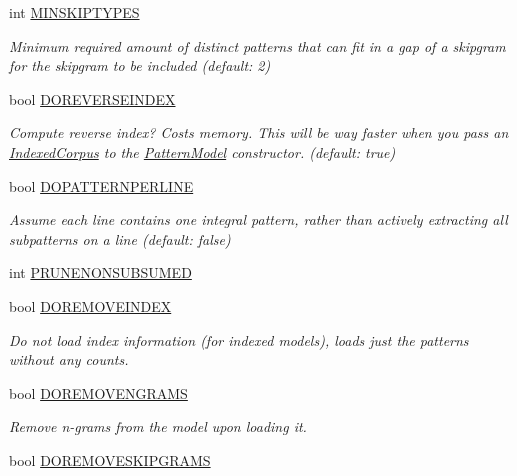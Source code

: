 \begin{DoxyCompactItemize}
int \hyperlink{classPatternModelOptions_ad5b2686b6f641463c54441a595259046}{M\+I\+N\+S\+K\+I\+P\+T\+Y\+P\+E\+S}
\begin{DoxyCompactList}\small\item\em Minimum required amount of distinct patterns that can fit in a gap of a skipgram for the skipgram to be included (default\+: 2) \end{DoxyCompactList}\item 
bool \hyperlink{classPatternModelOptions_ad4d4b2fa96e3355b9e3f4b8e51bb62ff}{D\+O\+R\+E\+V\+E\+R\+S\+E\+I\+N\+D\+E\+X}
\begin{DoxyCompactList}\small\item\em Compute reverse index? Costs memory. This will be way faster when you pass an \hyperlink{classIndexedCorpus}{Indexed\+Corpus} to the \hyperlink{classPatternModel}{Pattern\+Model} constructor. (default\+: true) \end{DoxyCompactList}\item 
bool \hyperlink{classPatternModelOptions_ad4391604983decec050de83f13cd6235}{D\+O\+P\+A\+T\+T\+E\+R\+N\+P\+E\+R\+L\+I\+N\+E}
\begin{DoxyCompactList}\small\item\em Assume each line contains one integral pattern, rather than actively extracting all subpatterns on a line (default\+: false) \end{DoxyCompactList}\item 
int \hyperlink{classPatternModelOptions_acb220b576d5b4126289cd4a6dec98a1c}{P\+R\+U\+N\+E\+N\+O\+N\+S\+U\+B\+S\+U\+M\+E\+D}
\item 
bool \hyperlink{classPatternModelOptions_ad7c8615dee16492c719bf455bb67e6a5}{D\+O\+R\+E\+M\+O\+V\+E\+I\+N\+D\+E\+X}
\begin{DoxyCompactList}\small\item\em Do not load index information (for indexed models), loads just the patterns without any counts. \end{DoxyCompactList}\item 
bool \hyperlink{classPatternModelOptions_a4ded839cdeb4f4191896d074ef45cf6e}{D\+O\+R\+E\+M\+O\+V\+E\+N\+G\+R\+A\+M\+S}
\begin{DoxyCompactList}\small\item\em Remove n-\/grams from the model upon loading it. \end{DoxyCompactList}\item 
bool \hyperlink{classPatternModelOptions_a88eb47abf2e38a2afac00e8cb9a7a869}{D\+O\+R\+E\+M\+O\+V\+E\+S\+K\+I\+P\+G\+R\+A\+M\+S}

\end{DoxyCompactItemize}
